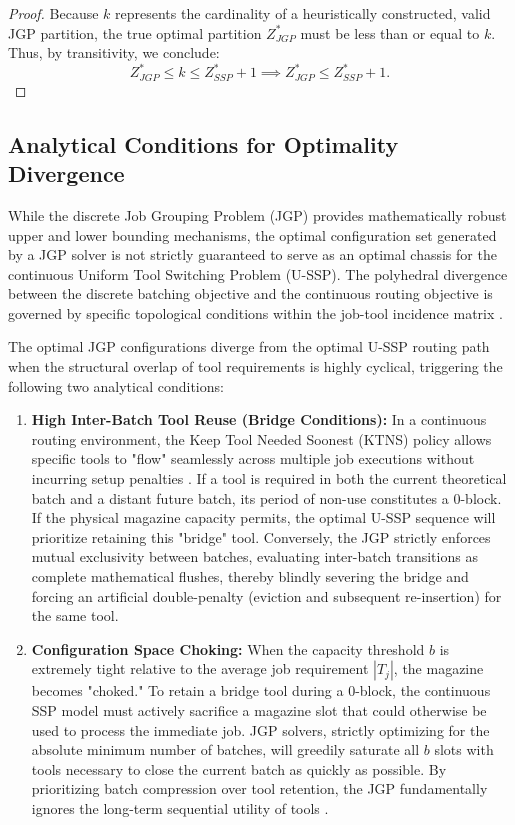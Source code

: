 \documentclass[11pt, a4paper]{book}
\begin{document}
\begin{proof}
		Because $k$ represents the cardinality of a heuristically constructed, valid JGP partition, the true optimal partition $Z_{JGP}^*$ must be less than or equal to $k$. Thus, by transitivity, we conclude:
		\begin{equation}
			Z_{JGP}^* \le k \le Z_{SSP}^* + 1 \implies Z_{JGP}^* \le Z_{SSP}^* + 1.
		\end{equation}
	\end{proof}
	
	
	\subsection{Analytical Conditions for Optimality Divergence}
	
	While the discrete Job Grouping Problem (JGP) provides mathematically robust upper and lower bounding mechanisms, the optimal configuration set generated by a JGP solver is not strictly guaranteed to serve as an optimal chassis for the continuous Uniform Tool Switching Problem (U-SSP). The polyhedral divergence between the discrete batching objective and the continuous routing objective is governed by specific topological conditions within the job-tool incidence matrix %
	.
	
	The optimal JGP configurations diverge from the optimal U-SSP routing path when the structural overlap of tool requirements is highly cyclical, triggering the following two analytical conditions:
	\begin{enumerate}
		\item \textbf{High Inter-Batch Tool Reuse (Bridge Conditions):} In a continuous routing environment, the Keep Tool Needed Soonest (KTNS) policy allows specific tools to "flow" seamlessly across multiple job executions without incurring setup penalties %
		. If a tool is required in both the current theoretical batch and a distant future batch, its period of non-use constitutes a 0-block. If the physical magazine capacity permits, the optimal U-SSP sequence will prioritize retaining this "bridge" tool. Conversely, the JGP strictly enforces mutual exclusivity between batches, evaluating inter-batch transitions as complete mathematical flushes, thereby blindly severing the bridge and forcing an artificial double-penalty (eviction and subsequent re-insertion) for the same tool.
		\item \textbf{Configuration Space Choking:} When the capacity threshold $b$ is extremely tight relative to the average job requirement $|T_j|$, the magazine becomes "choked." To retain a bridge tool during a 0-block, the continuous SSP model must actively sacrifice a magazine slot that could otherwise be used to process the immediate job. JGP solvers, strictly optimizing for the absolute minimum number of batches, will greedily saturate all $b$ slots with tools necessary to close the current batch as quickly as possible. By prioritizing batch compression over tool retention, the JGP fundamentally ignores the long-term sequential utility of tools %
		.
	\end{enumerate}
	
\end{document}
